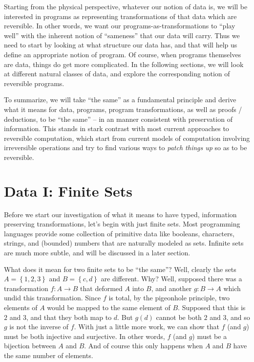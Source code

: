 \documentclass{article}
\begin{document}
Starting from the physical perspective, whatever our notion of data
is, we will be interested in programs as representing transformations
of that data which are reversible. In other words, we want our
programs-as-transformations to ``play well'' with the inherent notion
of ``sameness'' that our data will carry. Thus we need to start by
looking at what structure our data has, and that will help us define
an appropriate notion of program. Of course, when programs themselves
are data, things do get more complicated.  In the following sections,
we will look at different natural classes of data, and explore the
corresponding notion of reversible programs.

To summarize, we will take ``the same'' as a fundamental principle and
derive what it means for data, programs, program transformations, as
well as proofs / deductions, to be ``the same'' -- in an manner
consistent with preservation of information. This stands in stark
contrast with most current approaches to reversible computation, which
start from current models of computation involving irreversible
operations and try to find various ways to \emph{patch things up} so
as to be reversible.

\section{Data I: Finite Sets}

Before we start our investigation of what it means to have typed,
information preserving transformations, let's begin with just
finite sets. Most programming languages provide some collection of primitive
data like booleans, characters, strings, and (bounded) numbers that are
naturally modeled as sets. Infinite sets are much more subtle, and will be
discussed in a later section.

What does it mean for two finite sets to be ``the same''?  Well, clearly the
sets $A = \left\{1, 2, 3\right\}$ and $B = \left\{c, d\right\}$ are different.
Why?  Well, supposed there was a transformation $f : A \rightarrow B$ that
deformed $A$ into $B$, and another $g : B \rightarrow A$ which undid this
transformation. Since $f$ is total, by the pigeonhole principle, two elements
of $A$ would be mapped to the same element of $B$. Supposed that this is $2$ and
$3$, and that they both map to $d$.  But $g(d)$ cannot be both $2$ and $3$, and
so $g$ is not the inverse of $f$. With just a little more work, we can show
that $f$ (and $g$) must be both injective and surjective. In other words,
$f$ (and $g$) must be a bijection between $A$ and $B$.  And of course this 
only happens when $A$ and $B$ have the same number of elements.
\end{document}
